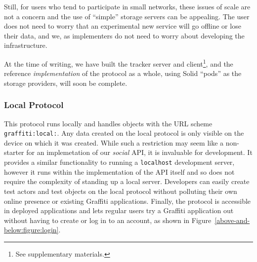 Still, for users who tend to participate in small networks, these issues
of scale are not a concern and the use of ``simple'' storage servers can be appealing.
The user does not need to worry that an experimental new service
will go offline or lose their data, and we, as implementers do not need to
worry about developing the infrastructure.

At the time of writing, we have built the tracker server and client\footnote{
  See supplementary materials.
}, and the reference \emph{implementation} of the protocol as a whole,
using Solid ``pods'' as the storage providers,
will soon be complete.


\subsubsection{Local Protocol}

This protocol runs locally
and handles objects with the URL scheme \texttt{graffiti:local:}.
Any data created on the local protocol is only visible on the device on which
it was created.
While such a restriction may seem like a non-starter for an implemetation
of our \emph{social} API, it is invaluable for development.
It provides a similar functionality to running a \texttt{localhost} development server,
however it runs within the implementation of the API itself and so
does not require the complexity of standing up a local server.
Developers can easily create test actors and test objects on the local protocol
without polluting their own online presence or existing Graffiti applications.
Finally, the protocol is accessible in deployed applications
and lets regular users try a Graffiti application out without
having to create or log in to an account, as shown in
Figure~\ref{above-and-below:figure:login}.

